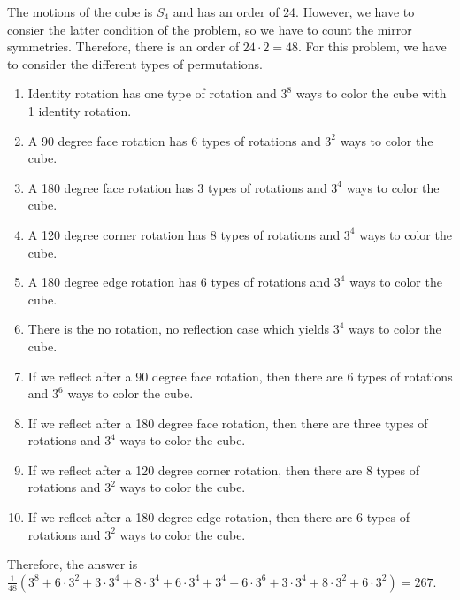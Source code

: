 \documentclass[12pt]{report}
\begin{document}
\sol The motions of the cube is $S_4$ and has an order of 24. However, we have to consier the latter condition of the problem, so we have to count the mirror symmetries. Therefore, there is an order of $24\cdot2 = 48$. For this problem, we have to consider the different types of permutations.
\begin{enumerate}[label=\alph*.]
    \item Identity rotation has one type of rotation and $3^8$ ways to color the cube with 1 identity rotation.
    \item A 90 degree face rotation has 6 types of rotations and $3^2$ ways to color the cube.
    \item A 180 degree face rotation has 3 types of rotations and $3^4$ ways to color the cube.
    \item A 120 degree corner rotation has 8 types of rotations and $3^4$ ways to color the cube.
    \item A 180 degree edge rotation has 6 types of rotations and $3^4$ ways to color the cube.
    \item There is the no rotation, no reflection case which yields $3^4$ ways to color the cube.
    \item If we reflect after a 90 degree face rotation, then there are 6 types of rotations and $3^6$ ways to color the cube.
    \item If we reflect after a 180 degree face rotation, then there are three types of rotations and $3^4$ ways to color the cube.
    \item If we reflect after a 120 degree corner rotation, then there are 8 types of rotations and $3^2$ ways to color the cube.
    \item If we reflect after a 180 degree edge rotation, then there are 6 types of rotations and $3^2$ ways to color the cube.
\end{enumerate}

Therefore, the answer is $\frac{1}{48}(3^8 + 6\cdot 3^2 + 3\cdot 3^4 + 8\cdot 3^4 + 6\cdot 3^4 + 3^4 + 6\cdot3^6 + 3\cdot3^4 + 8\cdot 3^2 + 6\cdot 3^2) = 267$.
\end{document}
